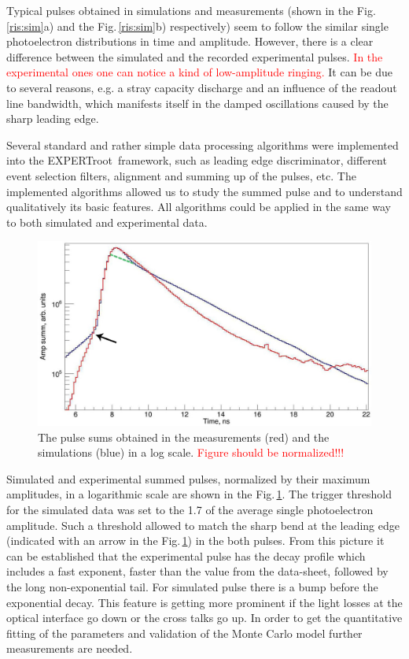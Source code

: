 \documentclass{webofc}
\newcommand{\er}{\textmd{EXPERTroot}}
\newcommand{\red}[1]{\textcolor{red}{#1}}
\begin{document}
Typical pulses obtained in simulations and measurements (shown in the Fig.\,\ref{ris:sim}a) and the Fig.\,\ref{ris:sim}b) respectively) seem to follow the similar single photoelectron distributions in time and amplitude.
However, there is a clear difference between the simulated and the recorded experimental pulses. \red{In the experimental ones one can notice a kind of low-amplitude ringing.} It can be due to several reasons, e.g. a stray capacity discharge and an influence of the readout line bandwidth, which manifests itself in the damped oscillations caused by the sharp leading edge.

Several standard and rather simple data processing algorithms were implemented into the \er\ framework, such as leading edge discriminator, different event selection filters, alignment and summing up of the pulses, etc. The implemented algorithms allowed us to study the summed pulse and to understand qualitatively its basic features. All algorithms could be applied in the same way to both simulated and experimental data.

\begin{figure}[h]
	\centering
	\includegraphics[width=0.63\linewidth]{summ.png}
	\caption{The pulse sums obtained in the measurements (red) and the simulations (blue) in a log scale. \red{Figure should be normalized!!!}}\label{ris:sum}
\end{figure}



Simulated and experimental summed pulses, normalized by their maximum amplitudes, in a logarithmic scale are shown in the Fig.\,\ref{ris:sum}.
The trigger threshold for the simulated data was set to the 1.7 of the average single photoelectron amplitude.
Such a threshold allowed to match the sharp bend at the leading edge (indicated with an arrow in the Fig.\,\ref{ris:sum}) in the both pulses. From this picture it can be established that the experimental pulse has the decay profile which includes a fast exponent, faster than the value from the data-sheet, followed by the long non-exponential tail. For simulated pulse there is a bump before the exponential decay. This feature is getting more prominent if the light losses at the optical interface go down or the cross talks go up. In order to get the quantitative fitting of the parameters and validation of the Monte Carlo model further measurements are needed. 
\end{document}
